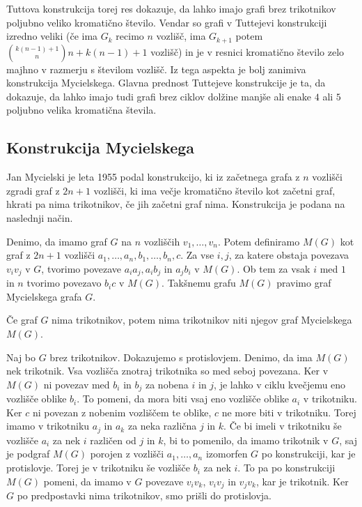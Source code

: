 \documentclass[mat1, tisk]{fmfdelo}
\begin{document}
Tuttova konstrukcija torej res dokazuje, da lahko imajo grafi brez trikotnikov poljubno veliko kromatično število. Vendar so grafi v Tuttejevi konstrukciji
izredno veliki (če ima $G_k$ recimo $n$ vozlišč, ima $G_{k+1}$ potem $\binom{k(n-1)+1}{n}n + k(n-1) + 1$ vozlišč) in je v resnici kromatično število zelo majhno 
v razmerju s številom vozlišč. Iz tega aspekta je bolj zanimiva konstrukcija Mycielskega. Glavna prednost Tuttejeve konstrukcije je ta, da dokazuje, da lahko imajo 
tudi grafi brez ciklov dolžine manjše ali enake $4$ ali $5$ poljubno velika kromatična števila.

\subsection{Konstrukcija Mycielskega}
Jan Mycielski je leta 1955 podal konstrukcijo, ki iz začetnega grafa z $n$ vozlišči zgradi graf z $2n + 1$ vozlišči, ki ima večje kromatično število kot
začetni graf, hkrati pa nima trikotnikov, če jih začetni graf nima. Konstrukcija je podana na naslednji način.

Denimo, da imamo graf $G$ na $n$ vozliščih ${v_1, \ldots, v_n}$. Potem definiramo $M(G)$ kot graf z $2n + 1$ vozlišči ${a_1, \ldots, a_n, b_1, \ldots, b_n, c}$. 
Za vse $i, j$, za katere obstaja povezava $v_iv_j$ v $G$, tvorimo povezave $a_ia_j, a_ib_j$ in $a_jb_i$ v $M(G)$. Ob tem za vsak $i$ med $1$ in $n$ tvorimo 
povezavo $b_ic$ v $M(G)$. Takšnemu grafu $M(G)$ pravimo graf Mycielskega grafa $G$.

    \begin{trditev}
        Če graf $G$ nima trikotnikov, potem nima trikotnikov niti njegov graf Mycielskega $M(G)$.
    \end{trditev}

    \begin{dokaz}
        Naj bo $G$ brez trikotnikov. Dokazujemo s protislovjem. Denimo, da ima $M(G)$ nek trikotnik. Vsa vozlišča znotraj trikotnika so med seboj povezana. Ker v $M(G)$ ni povezav med 
        $b_i$ in $b_j$ za nobena $i$ in $j$, je lahko v ciklu kvečjemu eno vozlišče oblike $b_i$. To pomeni, da mora biti vsaj eno vozlišče oblike $a_i$ v trikotniku.
        Ker $c$ ni povezan z nobenim vozliščem te oblike, $c$ ne more biti v trikotniku. Torej imamo v trikotniku $a_j$ in $a_k$ za neka različna $j$ in $k$. Če bi imeli v
        trikotniku še vozlišče $a_i$ za nek $i$ različen od $j$ in $k$, bi to pomenilo, da imamo trikotnik v $G$, saj je podgraf $M(G)$ porojen z vozlišči ${a_1, \ldots, a_n}$
        izomorfen $G$ po konstrukciji, kar je protislovje. Torej je v trikotniku še vozlišče $b_i$ za nek $i$. To pa po konstrukciji $M(G)$ pomeni, da imamo v $G$ povezave $v_iv_k$, $v_iv_j$
        in $v_jv_k$, kar je trikotnik. Ker $G$ po predpostavki nima trikotnikov, smo prišli do protislovja.
    \end{dokaz}
\end{document}
